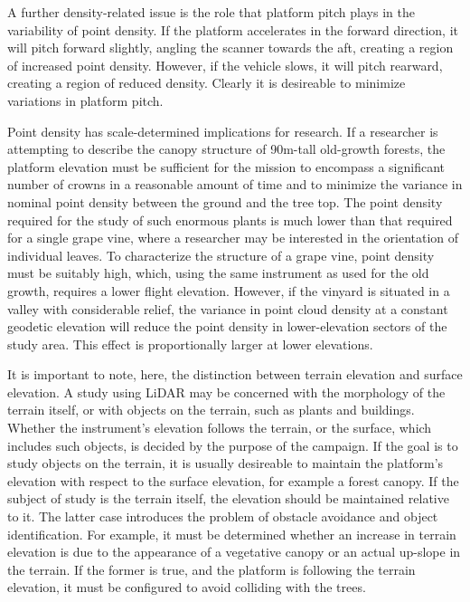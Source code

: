 \documentclass[10pt]{report}
\begin{document}
A further density-related issue is the role that platform pitch plays in the variability of point density. If the platform accelerates in the forward direction, it will pitch forward slightly, angling the scanner towards the aft, creating a region of increased point density. However, if the vehicle slows, it will pitch rearward, creating a region of reduced density. Clearly it is desireable to minimize variations in platform pitch.

Point density has scale-determined implications for research. If a researcher is attempting to describe the canopy structure of 90m-tall old-growth forests, the platform elevation must be sufficient for the mission to encompass a significant number of crowns in a reasonable amount of time and to  minimize the variance in nominal point density between the ground and the tree top. The point density required for the study of such enormous plants is much lower than that required for a single grape vine, where a researcher may be interested in the orientation of individual leaves. To characterize the structure of a grape vine, point density must be suitably high, which, using the same instrument as used for the old growth, requires a lower flight elevation. However, if the vinyard is situated in a valley with considerable relief, the variance in point cloud density at a constant geodetic elevation will reduce the point density in lower-elevation sectors of the study area. This effect is proportionally larger at lower elevations.

It is important to note, here, the distinction between terrain elevation and surface elevation. A study using LiDAR may be concerned with the morphology of the terrain itself, or with objects on the terrain, such as plants and buildings. Whether the instrument's elevation follows the terrain, or the surface, which includes such objects, is decided by the purpose of the campaign. If the goal is to study objects on the terrain, it is usually desireable to maintain the platform's elevation with respect to the surface elevation, for example a forest canopy. If the subject of study is the terrain itself, the elevation should be maintained relative to it. The latter case introduces the problem of obstacle avoidance and object identification. For example, it must be determined whether an increase in terrain elevation is due to the appearance of a vegetative canopy or an actual up-slope in the terrain. If the former is true, and the platform is following the terrain elevation, it must be configured to avoid colliding with the trees.
\end{document}
